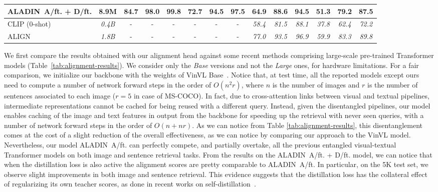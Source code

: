 \documentclass[sigconf]{acmart}
\newcommand{\ourmodel}{ALADIN}    \settopmatter{authorsperrow=4}
\begin{document}
\begin{table*}[htbp]
\begin{center}
\begin{tabular}{Lccccccccccccc}
\textbf{\ourmodel\ A/ft. + D/ft.} & 8.9M & 84.7 & 98.0 & \textbf{99.8} & \textbf{72.7} & \textbf{94.5} & \textbf{97.5} & \textbf{64.9} & \textbf{88.6} & \textbf{94.5} & \textbf{51.3} & \textbf{79.2} & \textbf{87.5} \\
\midrule
\midrule
CLIP (0-shot)~\citep{radford2021learning} & \textit{0.4B} & - & - & - & - & - & - & \textit{58.4} & \textit{81.5} & \textit{88.1} & \textit{37.8} & \textit{62.4} & \textit{72.2} \\
ALIGN~\citep{jia2021scaling} & \textit{1.8B} & - & - & - & - & - & - & \textit{77.0} & \textit{93.5} & \textit{96.9} & \textit{59.9} & \textit{83.3} & \textit{89.8} \\
\bottomrule
\end{tabular}
\label{tab:matching-results}
\end{center}
\end{table*}

We first compare the results obtained with our alignment head against some recent methods comprising large-scale pre-trained Transformer models (Table~\ref{tab:alignment-results}). We consider only the \textit{Base} versions and not the \textit{Large} ones, for hardware limitations. For a fair comparison, we initialize our backbone with the weights of VinVL Base~\citep{zhang2021vinvl}. Notice that, at test time, all the reported models except ours need to compute a number of network forward steps in the order of $O(n^2 r)$, where $n$ is the number of images and $r$ is the number of sentences associated to each image ($r=5$ in case of MS-COCO). In fact, due to cross-attention links between visual and textual pipelines, intermediate representations cannot be cached for being reused with a different query. Instead, given the disentangled pipelines, our model enables caching of the image and text features in output from the backbone for speeding up the retrieval with never seen queries, with a number of network forward steps in the order of $O(n + nr)$. As we can notice from Table \ref{tab:alignment-results}, this disentanglement comes at the cost of a slight reduction of the overall effectiveness, as we can notice by comparing our approach to the VinVL model. Nevertheless, our model \ourmodel\ A/ft. can perfectly compete, and partially overtake, all the previous entangled visual-textual Transformer models on both image and sentence retrieval tasks. From the results on the \ourmodel\ A/ft. + D/ft. model, we can notice that when the distillation loss is also active the alignment scores are pretty comparable to \ourmodel\ A/ft. In particular, on the 5K test set, we observe slight improvements in both image and sentence retrieval. This evidence suggests that the distillation loss has the collateral effect of regularizing its own teacher scores, as done in recent works on self-distillation~\citep{zhang2019your,caron2021emerging}.
\end{document}
